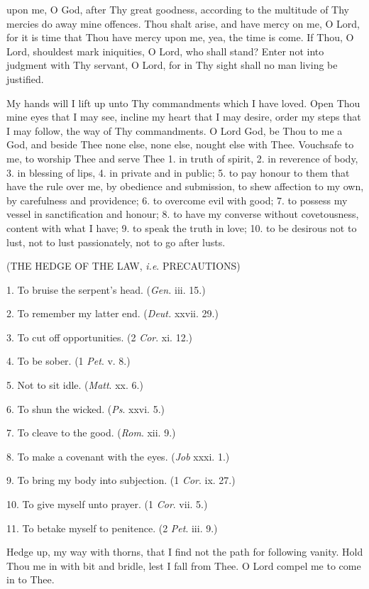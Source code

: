 upon me, O God, after Thy great goodness, according to the multitude of Thy mercies do away mine offences. Thou shalt arise, and have mercy on me, O Lord, for it is time that Thou have mercy upon me, yea, the time is come. If Thou, O Lord, shouldest mark iniquities, O Lord, who shall stand? Enter not into judgment with Thy servant, O Lord, for in Thy sight shall no man living be justified.


My hands will I lift up unto Thy commandments which I have loved. Open Thou mine eyes that I may see, incline my heart that I may desire, order my steps that I may follow, the way of Thy commandments. O Lord God, be Thou to me a God, and beside Thee none else, none else, nought else with Thee. Vouchsafe to me, to worship Thee and serve Thee  1. in truth of spirit, 2. in reverence of body, 3. in blessing of lips, 4. in private and in public; 5. to pay honour to them that have the rule over me, by obedience and submission, to shew affection to my own, by carefulness and providence; 6. to overcome evil with good; 7. to possess my vessel in sanctification and honour; 8. to have my converse without covetousness, content with what I have; 9. to speak the truth in love; 10. to be desirous not to lust, not to lust passionately, not to go after lusts.

(THE HEDGE OF THE LAW, \emph{i.e}. PRECAUTIONS)

1. To bruise the serpent’s head. (\emph{Gen.} iii. 15.)

2. To remember my latter end. (\emph{Deut. }xxvii. 29.)

3. To cut off opportunities. (2 \emph{Cor}. xi. 12.)

4. To be sober. (1 \emph{Pet}. v. 8.)

5. Not to sit idle. (\emph{Matt}. xx. 6.)

6. To shun the wicked. (\emph{Ps}. xxvi. 5.)

7. To cleave to the good. (\emph{Rom}. xii. 9.)

8. To make a covenant with the eyes. (\emph{Job} xxxi. 1.)

9. To bring my body into subjection. (1 \emph{Cor}. ix. 27.)

10. To give myself unto prayer. (1 \emph{Cor}. vii. 5.)

11. To betake myself to penitence. (2 \emph{Pet}. iii. 9.)

Hedge up, my way with thorns, that I find not the path for following vanity. Hold Thou me in with bit and bridle, lest I fall from Thee. O Lord compel me to come in to Thee.

